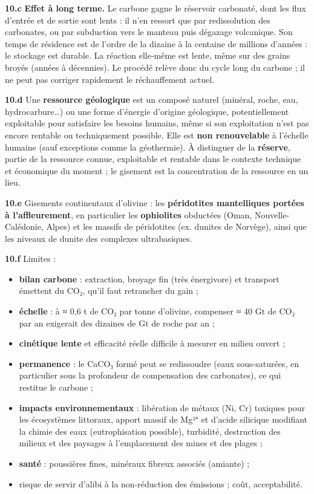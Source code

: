 \documentclass[11pt,a4paper]{article}
\providecommand{\tightlist}{\setlength{\itemsep}{0pt}\setlength{\parskip}{0pt}}
\begin{document}
\textbf{10.c} \textbf{Effet à long terme.} Le carbone gagne le réservoir carbonaté, dont les flux d'entrée et de sortie sont lents : il n'en ressort que par redissolution des carbonates, ou par subduction vers le manteau puis dégazage volcanique. Son temps de résidence est de l'ordre de la dizaine à la centaine de millions d'années : le stockage est durable. La réaction elle-même est lente, même sur des grains broyés (années à décennies). Le procédé relève donc du cycle long du carbone ; il ne peut pas corriger rapidement le réchauffement actuel.

\textbf{10.d} Une \textbf{ressource géologique} est un composé naturel (minéral, roche, eau, hydrocarbure\ldots) ou une forme d'énergie d'origine géologique, potentiellement exploitable pour satisfaire les besoins humains, même si son exploitation n'est pas encore rentable ou techniquement possible. Elle est \textbf{non renouvelable} à l'échelle humaine (sauf exceptions comme la géothermie). À distinguer de la \textbf{réserve}, partie de la ressource connue, exploitable et rentable dans le contexte technique et économique du moment ; le gisement est la concentration de la ressource en un lieu.

\textbf{10.e} Gisements continentaux d'olivine : les \textbf{péridotites mantelliques portées à l'affleurement}, en particulier les \textbf{ophiolites} obductées (Oman, Nouvelle-Calédonie, Alpes) et les massifs de péridotites (ex. dunites de Norvège), ainsi que les niveaux de dunite des complexes ultrabasiques.

\textbf{10.f} Limites :

\begin{itemize}
\tightlist
\item
  \textbf{bilan carbone} : extraction, broyage fin (très énergivore) et transport émettent du CO₂, qu'il faut retrancher du gain ;
\item
  \textbf{échelle} : à ≈ 0,6 t de CO₂ par tonne d'olivine, compenser ≈ 40 Gt de CO₂ par an exigerait des dizaines de Gt de roche par an ;
\item
  \textbf{cinétique lente} et efficacité réelle difficile à mesurer en milieu ouvert ;
\item
  \textbf{permanence} : le CaCO₃ formé peut se redissoudre (eaux sous-saturées, en particulier sous la profondeur de compensation des carbonates), ce qui restitue le carbone ;
\item
  \textbf{impacts environnementaux} : libération de métaux (Ni, Cr) toxiques pour les écosystèmes littoraux, apport massif de Mg²⁺ et d'acide silicique modifiant la chimie des eaux (eutrophisation possible), turbidité, destruction des milieux et des paysages à l'emplacement des mines et des plages ;
\item
  \textbf{santé} : poussières fines, minéraux fibreux associés (amiante) ;
\item
  risque de servir d'alibi à la non-réduction des émissions ; coût, acceptabilité.
\end{itemize}
\end{document}
